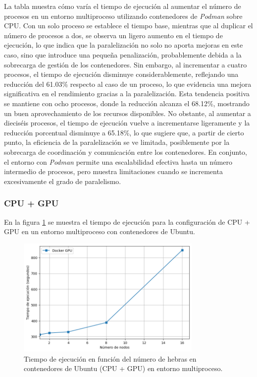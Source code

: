 La tabla muestra cómo varía el tiempo de ejecución al aumentar el número de procesos en un entorno multiproceso utilizando contenedores de \textit{Podman} sobre CPU. Con un solo proceso se establece el tiempo base, mientras que al duplicar el número de procesos a dos, se observa un ligero aumento en el tiempo de ejecución, lo que indica que la paralelización no solo no aporta mejoras en este caso, sino que introduce una pequeña penalización, probablemente debida a la sobrecarga de gestión de los contenedores. Sin embargo, al incrementar a cuatro procesos, el tiempo de ejecución disminuye considerablemente, reflejando una reducción del 61.03\% respecto al caso de un proceso, lo que evidencia una mejora significativa en el rendimiento gracias a la paralelización. Esta tendencia positiva se mantiene con ocho procesos, donde la reducción alcanza el 68.12\%, mostrando un buen aprovechamiento de los recursos disponibles. No obstante, al aumentar a dieciséis procesos, el tiempo de ejecución vuelve a incrementarse ligeramente y la reducción porcentual disminuye a 65.18\%, lo que sugiere que, a partir de cierto punto, la eficiencia de la paralelización se ve limitada, posiblemente por la sobrecarga de coordinación y comunicación entre los contenedores. En conjunto, el entorno con \textit{Podman} permite una escalabilidad efectiva hasta un número intermedio de procesos, pero muestra limitaciones cuando se incrementa excesivamente el grado de paralelismo.

\subsubsection{CPU + GPU}

En la figura \ref{fig:multi-node_ubuntu_docker_gpu_time} se muestra el tiempo de ejecución para la configuración de CPU + GPU en un entorno multiproceso con contenedores de Ubuntu.

\begin{figure}[H]
    \centering
    \includegraphics[width=0.8\textwidth]{imagenes/cap5/multi-node_ubuntu_docker_gpu_time.png}
    \caption{Tiempo de ejecución en función del número de hebras en contenedores de Ubuntu (CPU + GPU) en entorno multiproceso.}
    \label{fig:multi-node_ubuntu_docker_gpu_time}
\end{figure}

